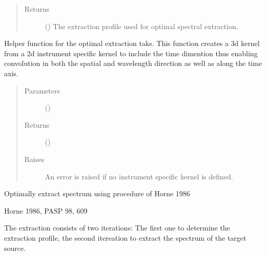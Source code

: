 \documentclass[a4paper,10pt,english]{sphinxmanual}
\begin{document}
\begin{fulllineitems}
\begin{fulllineitems}
\begin{quote}
\begin{description}
\begin{itemize}
\end{itemize}

\item[{Returns}] \leavevmode
{} () \textendash{} The extraction profile used for optimal spectral extraction.

\end{description}\end{quote}

\end{fulllineitems}


\begin{fulllineitems}
\label{\detokenize{cascade.TSO:cascade.TSO.TSO.TSOSuite._create_3dKernel}}
Helper function for the optimal extraction taks. This function
creates a 3d kernel from a 2d instrument specific kernel
to include the time dimention thus enabling convolution in both the
spatial and wavelength direction as well as along the time axis.
\begin{quote}\begin{description}
\item[{Parameters}] \leavevmode
{} () \textendash{} 

\item[{Returns}] \leavevmode
{} ()

\item[{Raises}] \leavevmode
{} \textendash{} An error is raised if no instrument specific kernel is defined.

\end{description}\end{quote}

\end{fulllineitems}


\begin{fulllineitems}
\label{\detokenize{cascade.TSO:cascade.TSO.TSO.TSOSuite.optimal_extraction}}
Optimally extract spectrum using procedure of Horne 1986
%
\begin{footnote}[1]\sphinxAtStartFootnote
Horne 1986, PASP 98, 609
%
\end{footnote} The extraction consists of two iterations: The first one to
determine the extraction profile, the second itereation to
extract the spectrum of the target source.


\end{fulllineitems}
\end{fulllineitems}
\end{document}
